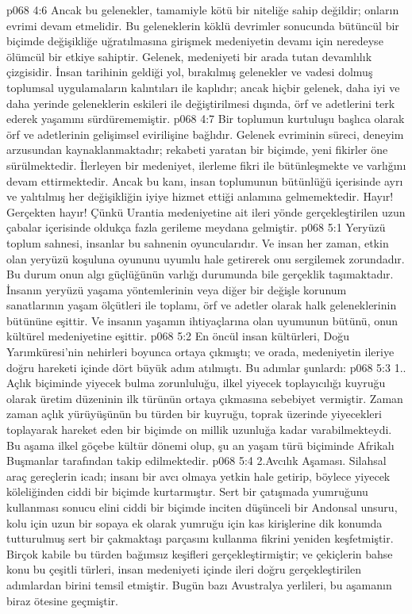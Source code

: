 \vs p068 4:6 Ancak bu gelenekler, tamamiyle kötü bir niteliğe sahip değildir; onların evrimi devam etmelidir. Bu geleneklerin köklü devrimler sonucunda bütüncül bir biçimde değişikliğe uğratılmasına girişmek medeniyetin devamı için neredeyse ölümcül bir etkiye sahiptir. Gelenek, medeniyeti bir arada tutan devamlılık çizgisidir. İnsan tarihinin geldiği yol, bırakılmış gelenekler ve vadesi dolmuş toplumsal uygulamaların kalıntıları ile kaplıdır; ancak hiçbir gelenek, daha iyi ve daha yerinde geleneklerin eskileri ile değiştirilmesi dışında, örf ve adetlerini terk ederek yaşamını sürdürememiştir.
\vs p068 4:7 Bir toplumun kurtuluşu başlıca olarak örf ve adetlerinin gelişimsel evirilişine bağlıdır. Gelenek evriminin süreci, deneyim arzusundan kaynaklanmaktadır; rekabeti yaratan bir biçimde, yeni fikirler öne sürülmektedir. İlerleyen bir medeniyet, ilerleme fikri ile bütünleşmekte ve varlığını devam ettirmektedir. Ancak bu kanı, insan toplumunun bütünlüğü içerisinde ayrı ve yalıtılmış her değişikliğin iyiye hizmet ettiği anlamına gelmemektedir. Hayır! Gerçekten hayır! Çünkü Urantia medeniyetine ait ileri yönde gerçekleştirilen uzun çabalar içerisinde oldukça fazla gerileme meydana gelmiştir.
\vs p068 5:1 Yeryüzü toplum sahnesi, insanlar bu sahnenin oyuncularıdır. Ve insan her zaman, etkin olan yeryüzü koşuluna oyununu uyumlu hale getirerek onu sergilemek zorundadır. Bu durum onun algı güçlüğünün varlığı durumunda bile gerçeklik taşımaktadır. İnsanın yeryüzü yaşama yöntemlerinin veya diğer bir değişle korunum sanatlarının yaşam ölçütleri ile toplamı, örf ve adetler olarak halk geleneklerinin bütününe eşittir. Ve insanın yaşamın ihtiyaçlarına olan uyumunun bütünü, onun kültürel medeniyetine eşittir.
\vs p068 5:2 En öncül insan kültürleri, Doğu Yarımküresi’nin nehirleri boyunca ortaya çıkmıştı; ve orada, medeniyetin ileriye doğru hareketi içinde dört büyük adım atılmıştı. Bu adımlar şunlardı:
\vs p068 5:3 1.. Açlık biçiminde yiyecek bulma zorunluluğu, ilkel yiyecek toplayıcılığı kuyruğu olarak üretim düzeninin ilk türünün ortaya çıkmasına sebebiyet vermiştir. Zaman zaman açlık yürüyüşünün bu türden bir kuyruğu, toprak üzerinde yiyecekleri toplayarak hareket eden bir biçimde on millik uzunluğa kadar varabilmekteydi. Bu aşama ilkel göçebe kültür dönemi olup, şu an yaşam türü biçiminde Afrikalı Buşmanlar tarafından takip edilmektedir.
\vs p068 5:4 2.\bibnobreakspace Avcılık Aşaması. Silahsal araç gereçlerin icadı; insanı bir avcı olmaya yetkin hale getirip, böylece yiyecek köleliğinden ciddi bir biçimde kurtarmıştır. Sert bir çatışmada yumruğunu kullanması sonucu elini ciddi bir biçimde inciten düşünceli bir Andonsal unsuru, kolu için uzun bir sopaya ek olarak yumruğu için kas kirişlerine dik konumda tutturulmuş sert bir çakmaktaşı parçasını kullanma fikrini yeniden keşfetmiştir. Birçok kabile bu türden bağımsız keşifleri gerçekleştirmiştir; ve çekiçlerin bahse konu bu çeşitli türleri, insan medeniyeti içinde ileri doğru gerçekleştirilen adımlardan birini temsil etmiştir. Bugün bazı Avustralya yerlileri, bu aşamanın biraz ötesine geçmiştir.
